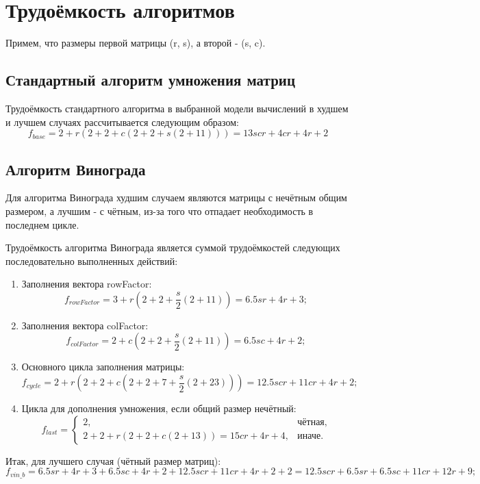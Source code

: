 \documentclass[12pt]{report}
\begin{document}
\section{Трудоёмкость алгоритмов}
Примем, что размеры первой матрицы (r, s), а второй - (s, c).
\subsection{Стандартный алгоритм умножения матриц}

Трудоёмкость стандартного алгоритма в выбранной модели вычислений в худшем и лучшем случаях рассчитывается следующим образом:
\begin{equation}
	f_{base} = 2 + r(2 + 2 + c(2 + 2 + s(2 + 11))) = 13scr + 4cr + 4r + 2
\end{equation}

\subsection{Алгоритм Винограда}
Для алгоритма Винограда худшим случаем являются матрицы с нечётным общим размером, а лучшим - с чётным, из-за того что отпадает необходимость в последнем цикле.

Трудоёмкость алгоритма Винограда является суммой трудоёмкостей следующих последовательно выполненных действий:
\begin{enumerate}
	
	\item Заполнения вектора rowFactor:
	\begin{equation}
	f_{rowFactor} = 3 + r(2 + 2 + \frac{s}{2}(2 + 11)) = 6.5sr + 4r + 3;
	\end{equation}
	
	\item Заполнения вектора colFactor:
	\begin{equation}
	f_{colFactor} = 2 + c(2 + 2 + \frac{s}{2}(2 + 11)) = 6.5sc + 4r + 2;
	\end{equation}
	
	\item Основного цикла заполнения матрицы:
	\begin{equation}
	f_{cycle} = 2 + r(2 + 2 + c(2 + 2 + 7 + \frac{s}{2}(2 + 23))) = 12.5scr + 11cr + 4r + 2;
	\end{equation}
	
	\item Цикла для дополнения умножения, если общий размер нечётный:
	\begin{equation}
	f_{last} = \begin{cases}
	2, & \text{чётная,}\\
	2 + 2 + r(2 + 2 + c(2 + 13)) = 15cr + 4r + 4, & \text{иначе.}
	\end{cases}
	\end{equation}
\end{enumerate}
Итак, для лучшего случая (чётный размер матриц): 
\begin{equation}
f_{vin\_b} = 6.5sr + 4r + 3 + 6.5sc + 4r + 2 + 12.5scr + 11cr + 4r + 2 + 2 = 12.5scr + 6.5sr + 6.5sc + 11cr + 12r + 9;
\end{equation}
\end{document}
